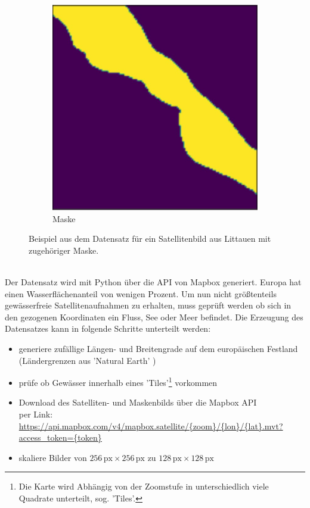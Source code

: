 \begin{figure}
\begin{subfigure}{0.48\textwidth}
        \includegraphics[width=\textwidth]{content/img/datensatz_mask.jpg}
        \caption{Maske}
    \end{subfigure}
    \caption{Beispiel aus dem Datensatz für ein Satellitenbild aus Littauen mit zugehöriger Maske.\cite{mapbox}}
    \label{fig:datensatz}
\end{figure}
\\
Der Datensatz wird mit Python über die API von Mapbox\cite{mapbox} generiert.
Europa hat einen Wasserflächenanteil von wenigen Prozent.
Um nun nicht größtenteils gewässerfreie Satellitenaufnahmen zu erhalten, muss geprüft werden ob sich in den gezogenen Koordinaten ein Fluss, See oder Meer befindet.
Die Erzeugung des Datensatzes kann in folgende Schritte unterteilt werden:
\begin{itemize}
    \item generiere zufällige Längen- und Breitengrade auf dem europäischen Festland (Ländergrenzen aus 'Natural Earth' \cite{naturalearth})
    \item prüfe ob Gewässer innerhalb eines 'Tiles'\footnote{\label{foot:tiles}Die Karte wird Abhängig von der Zoomstufe in unterschiedlich viele Quadrate unterteilt, sog. 'Tiles'.} vorkommen
    \item Download des Satelliten- und Maskenbilds über die Mapbox API\cite{mapbox} \\
          per Link: \url{https://api.mapbox.com/v4/mapbox.satellite/{zoom}/{lon}/{lat}.mvt?access_token=\{token\}}
    \item skaliere Bilder von $256 \, \text{px} \times 256 \, \text{px}$ zu $128 \, \text{px} \times 128 \, \text{px}$
\end{itemize}
